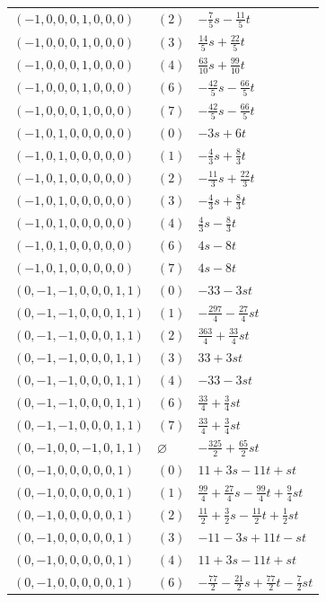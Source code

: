 \begin{longtable}{@{}lll@{}}
$(-1,0,0,0,1,0,0,0)$ & $(2)$ & $-\frac{7}{5}s-\frac{11}{5}t$\\
$(-1,0,0,0,1,0,0,0)$ & $(3)$ & $\frac{14}{5}s+\frac{22}{5}t$\\
$(-1,0,0,0,1,0,0,0)$ & $(4)$ & $\frac{63}{10}s+\frac{99}{10}t$\\
$(-1,0,0,0,1,0,0,0)$ & $(6)$ & $-\frac{42}{5}s-\frac{66}{5}t$\\
$(-1,0,0,0,1,0,0,0)$ & $(7)$ & $-\frac{42}{5}s-\frac{66}{5}t$\\
$(-1,0,1,0,0,0,0,0)$ & $(0)$ & $-3s+6t$\\
$(-1,0,1,0,0,0,0,0)$ & $(1)$ & $-\frac{4}{3}s+\frac{8}{3}t$\\
$(-1,0,1,0,0,0,0,0)$ & $(2)$ & $-\frac{11}{3}s+\frac{22}{3}t$\\
$(-1,0,1,0,0,0,0,0)$ & $(3)$ & $-\frac{4}{3}s+\frac{8}{3}t$\\
$(-1,0,1,0,0,0,0,0)$ & $(4)$ & $\frac{4}{3}s-\frac{8}{3}t$\\
$(-1,0,1,0,0,0,0,0)$ & $(6)$ & $4s-8t$\\
$(-1,0,1,0,0,0,0,0)$ & $(7)$ & $4s-8t$\\
$(0,-1,-1,0,0,0,1,1)$ & $(0)$ & $-33-3st$\\
$(0,-1,-1,0,0,0,1,1)$ & $(1)$ & $-\frac{297}{4}-\frac{27}{4}st$\\
$(0,-1,-1,0,0,0,1,1)$ & $(2)$ & $\frac{363}{4}+\frac{33}{4}st$\\
$(0,-1,-1,0,0,0,1,1)$ & $(3)$ & $33+3st$\\
$(0,-1,-1,0,0,0,1,1)$ & $(4)$ & $-33-3st$\\
$(0,-1,-1,0,0,0,1,1)$ & $(6)$ & $\frac{33}{4}+\frac{3}{4}st$\\
$(0,-1,-1,0,0,0,1,1)$ & $(7)$ & $\frac{33}{4}+\frac{3}{4}st$\\
$(0,-1,0,0,-1,0,1,1)$ & $\varnothing$ & $-\frac{325}{2}+\frac{65}{2}st$\\
$(0,-1,0,0,0,0,0,1)$ & $(0)$ & $11+3s-11t+st$\\
$(0,-1,0,0,0,0,0,1)$ & $(1)$ & $\frac{99}{4}+\frac{27}{4}s-\frac{99}{4}t+\frac{9}{4}st$\\
$(0,-1,0,0,0,0,0,1)$ & $(2)$ & $\frac{11}{2}+\frac{3}{2}s-\frac{11}{2}t+\frac{1}{2}st$\\
$(0,-1,0,0,0,0,0,1)$ & $(3)$ & $-11-3s+11t-st$\\
$(0,-1,0,0,0,0,0,1)$ & $(4)$ & $11+3s-11t+st$\\
$(0,-1,0,0,0,0,0,1)$ & $(6)$ & $-\frac{77}{2}-\frac{21}{2}s+\frac{77}{2}t-\frac{7}{2}st$\\

\end{longtable}
